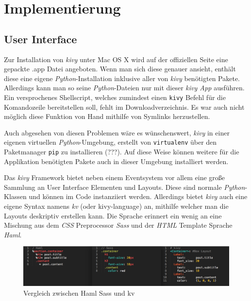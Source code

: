 \section{Implementierung}
    \subsection{User Interface}
    
    	Zur Installation von \emph{kivy} unter Mac OS X wird auf der offiziellen Seite eine gepackte .app Datei angeboten. Wenn man sich diese genauer ansieht, enthält diese eine eigene \emph{Python}-Installation inklusive aller von \emph{kivy} benötigten Pakete. Allerdings kann man so seine \emph{Python}-Dateien nur mit dieser \emph{kivy App} ausführen. Ein versprochenes Shellscript, welches zumindest einen \texttt{kivy} Befehl für die Komandozeile bereitstellen soll, fehlt im Downloadverzeichnis. Es war auch nicht möglich diese Funktion von Hand mithilfe von Symlinks herzustellen.
        
        Auch abgesehen von diesen Problemen wäre es wünschenswert, \emph{kivy} in einer eigenen virtuellen \emph{Python}-Umgebung, erstellt von \texttt{virtualenv} über den Paketmanager \texttt{pip} zu installieren (???). Auf diese Weise können weitere für die Applikation benötigten Pakete auch in dieser Umgebung installiert werden.
        
        Das \emph{kivy} Framework bietet neben einem Eventsystem vor allem eine große Sammlung an User Interface Elementen und Layouts. Diese sind normale \emph{Python}-Klassen und können im Code instanziiert werden. Allerdings bietet \emph{kivy} auch eine eigene Syntax namens \emph{kv} (oder kivy-language) an, mithilfe welcher man die Layouts deskriptiv erstellen kann. Die Sprache erinnert ein wenig an eine Mischung aus dem \emph{CSS} Preprocessor \emph{Sass} und der \emph{HTML} Template Sprache \emph{Haml}.      
        
        \begin{figure}[H]
    		\centering
    		\includegraphics[width=15cm]{images/hamlsasskv.png}
    		\caption{Vergleich zwischen Haml Sass und kv}
    		\label{img:HamlSassKv}
		\end{figure}
        
